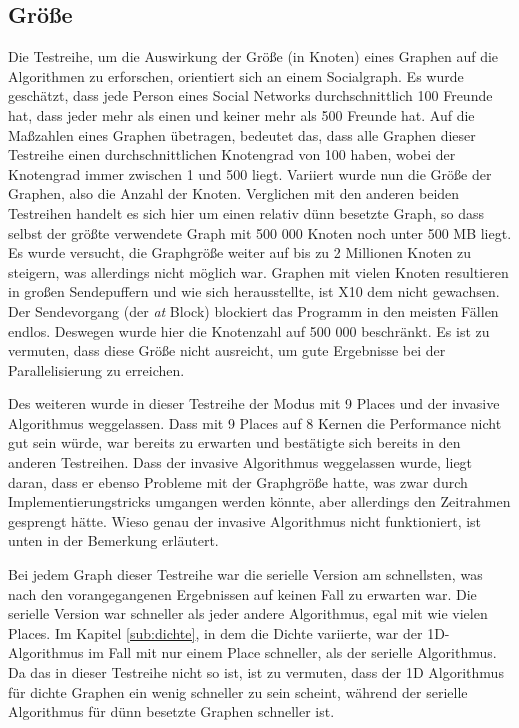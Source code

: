 \subsection{Größe} %
\label{sub:gr_e}
Die Testreihe, um die Auswirkung der Größe (in Knoten) eines Graphen auf die Algorithmen zu erforschen, orientiert sich an einem Socialgraph. Es wurde geschätzt, dass jede Person eines Social Networks durchschnittlich 100 Freunde hat, dass jeder mehr als einen und keiner mehr als 500 Freunde hat. Auf die Maßzahlen eines Graphen übetragen, bedeutet das, dass alle Graphen dieser Testreihe einen durchschnittlichen Knotengrad von 100 haben, wobei der Knotengrad immer zwischen 1 und 500 liegt. Variiert wurde nun die Größe der Graphen, also die Anzahl der Knoten. Verglichen mit den anderen beiden Testreihen handelt es sich hier um einen relativ dünn besetzte Graph, so dass selbst der größte verwendete Graph mit 500 000 Knoten noch unter 500 MB liegt. Es wurde versucht, die Graphgröße weiter auf bis zu 2 Millionen Knoten zu steigern, was allerdings nicht möglich war. Graphen mit vielen Knoten resultieren in großen Sendepuffern und wie sich herausstellte, ist X10 dem nicht gewachsen. Der Sendevorgang (der \textit{at} Block) blockiert das Programm in den meisten Fällen endlos. Deswegen wurde hier die Knotenzahl auf 500 000 beschränkt. Es ist zu vermuten, dass diese Größe nicht ausreicht, um gute Ergebnisse bei der Parallelisierung zu erreichen.

Des weiteren wurde in dieser Testreihe der Modus mit 9 Places und der invasive Algorithmus weggelassen. Dass mit 9 Places auf 8 Kernen die Performance nicht gut sein würde, war bereits zu erwarten und bestätigte sich bereits in den anderen Testreihen. Dass der invasive Algorithmus weggelassen wurde, liegt daran, dass er ebenso Probleme mit der Graphgröße hatte, was zwar durch Implementierungstricks umgangen werden könnte, aber allerdings den Zeitrahmen gesprengt hätte. Wieso genau der invasive Algorithmus nicht funktioniert, ist unten in der Bemerkung erläutert.

Bei jedem Graph dieser Testreihe war die serielle Version am schnellsten, was nach den vorangegangenen Ergebnissen auf keinen Fall zu erwarten war. Die serielle Version war schneller als jeder andere Algorithmus, egal mit wie vielen Places. Im Kapitel \ref{sub:dichte}, in dem die Dichte variierte, war der 1D-Algorithmus im Fall mit nur einem Place schneller, als der serielle Algorithmus. Da das in dieser Testreihe nicht so ist, ist zu vermuten, dass der 1D Algorithmus für dichte Graphen ein wenig schneller zu sein scheint, während der serielle Algorithmus für dünn besetzte Graphen schneller ist.

